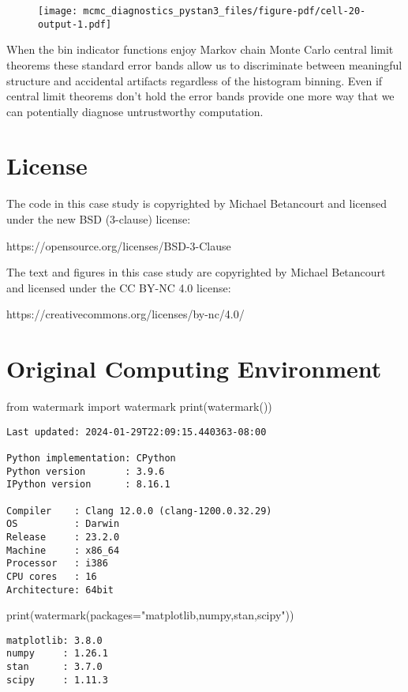 \documentclass[
  letterpaper,
  DIV=11,
  numbers=noendperiod]{scrartcl}
\newenvironment{Shaded}{\begin{snugshade}}{\end{snugshade}}
\newcommand{\BuiltInTok}[1]{\textcolor[rgb]{0.00,0.23,0.31}{#1}}
\newcommand{\ImportTok}[1]{\textcolor[rgb]{0.00,0.46,0.62}{#1}}
\newcommand{\NormalTok}[1]{\textcolor[rgb]{0.00,0.23,0.31}{#1}}
\newcommand{\OperatorTok}[1]{\textcolor[rgb]{0.37,0.37,0.37}{#1}}
\newcommand{\StringTok}[1]{\textcolor[rgb]{0.13,0.47,0.30}{#1}}
\begin{document}
\begin{figure}[H]

{\centering \texttt{[image: mcmc\_diagnostics\_pystan3\_files/figure-pdf/cell-20-output-1.pdf]}

}

\end{figure}

When the bin indicator functions enjoy Markov chain Monte Carlo central
limit theorems these standard error bands allow us to discriminate
between meaningful structure and accidental artifacts regardless of the
histogram binning. Even if central limit theorems don't hold the error
bands provide one more way that we can potentially diagnose
untrustworthy computation.

\hypertarget{license}{%
\section*{License}\label{license}}

The code in this case study is copyrighted by Michael Betancourt and
licensed under the new BSD (3-clause) license:

https://opensource.org/licenses/BSD-3-Clause

The text and figures in this case study are copyrighted by Michael
Betancourt and licensed under the CC BY-NC 4.0 license:

https://creativecommons.org/licenses/by-nc/4.0/

\hypertarget{original-computing-environment}{%
\section*{Original Computing
Environment}\label{original-computing-environment}}

\begin{Shaded}
\begin{Highlighting}[]
\ImportTok{from}\NormalTok{ watermark }\ImportTok{import}\NormalTok{ watermark}
\BuiltInTok{print}\NormalTok{(watermark())}
\end{Highlighting}
\end{Shaded}

\begin{verbatim}
Last updated: 2024-01-29T22:09:15.440363-08:00

Python implementation: CPython
Python version       : 3.9.6
IPython version      : 8.16.1

Compiler    : Clang 12.0.0 (clang-1200.0.32.29)
OS          : Darwin
Release     : 23.2.0
Machine     : x86_64
Processor   : i386
CPU cores   : 16
Architecture: 64bit
\end{verbatim}

\begin{Shaded}
\begin{Highlighting}[]
\BuiltInTok{print}\NormalTok{(watermark(packages}\OperatorTok{=}\StringTok{"matplotlib,numpy,stan,scipy"}\NormalTok{))}
\end{Highlighting}
\end{Shaded}

\begin{verbatim}
matplotlib: 3.8.0
numpy     : 1.26.1
stan      : 3.7.0
scipy     : 1.11.3
\end{verbatim}
\end{document}
